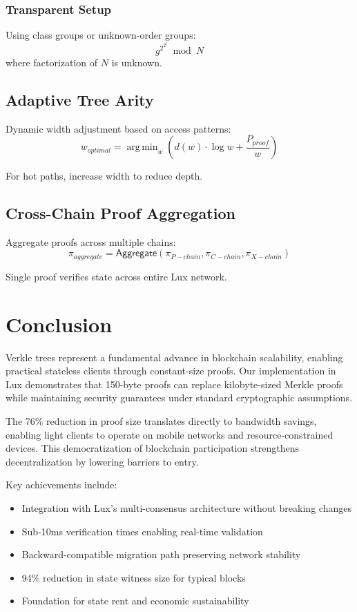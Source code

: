\documentclass[11pt,a4paper]{article}
\DeclareMathOperator*{\argmin}{arg\,min}
\theoremstyle{definition}
\begin{document}
\subsubsection{Transparent Setup}
Using class groups or unknown-order groups:
\begin{equation}
    g^{2^{2^t}} \bmod N
\end{equation}
where factorization of $N$ is unknown.

\subsection{Adaptive Tree Arity}

Dynamic width adjustment based on access patterns:
\begin{equation}
    w_{optimal} = \argmin_{w} \left( d(w) \cdot \log w + \frac{P_{proof}}{w} \right)
\end{equation}

For hot paths, increase width to reduce depth.

\subsection{Cross-Chain Proof Aggregation}

Aggregate proofs across multiple chains:
\begin{equation}
    \pi_{aggregate} = \mathsf{Aggregate}(\pi_{P-chain}, \pi_{C-chain}, \pi_{X-chain})
\end{equation}

Single proof verifies state across entire Lux network.

\section{Conclusion}

Verkle trees represent a fundamental advance in blockchain scalability, enabling practical stateless clients through constant-size proofs. Our implementation in Lux demonstrates that 150-byte proofs can replace kilobyte-sized Merkle proofs while maintaining security guarantees under standard cryptographic assumptions.

The 76\% reduction in proof size translates directly to bandwidth savings, enabling light clients to operate on mobile networks and resource-constrained devices. This democratization of blockchain participation strengthens decentralization by lowering barriers to entry.

Key achievements include:
\begin{itemize}
    \item Integration with Lux's multi-consensus architecture without breaking changes
    \item Sub-10ms verification times enabling real-time validation
    \item Backward-compatible migration path preserving network stability
    \item 94\% reduction in state witness size for typical blocks
    \item Foundation for state rent and economic sustainability
\end{itemize}
\end{document}

